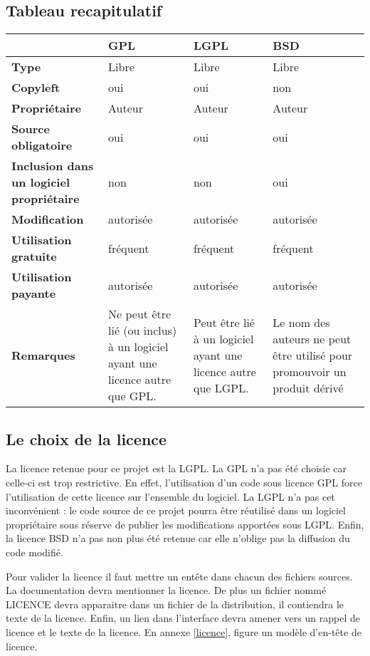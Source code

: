 	\subsection{Tableau recapitulatif}
		\begin{tabular}{|p{3cm}|p{3cm}|p{3cm}|p{3cm}|}
			\hline                 
			& \textbf{GPL} & \textbf{LGPL} & \textbf{BSD} \\              
			\hline                 
			\textbf{Type} & Libre & Libre & Libre \\
			\hline                 
			\textbf{Copyleft} & oui & oui & non \\
			\hline                 
			\textbf{Propriétaire} & Auteur & Auteur & Auteur \\
			\hline                 
			\textbf{Source obligatoire} & oui & oui & oui \\
			\hline                 
			\textbf{Inclusion dans un logiciel propriétaire} & non & non & oui \\
			\hline                 
			\textbf{Modification} & autorisée & autorisée & autorisée \\
			\hline                 
			\textbf{Utilisation gratuite} & fréquent & fréquent & fréquent \\
			\hline                 
			\textbf{Utilisation payante} & autorisée & autorisée & autorisée \\
			\hline                 
			\textbf{Remarques} & Ne peut être lié (ou inclus) à un logiciel ayant une licence autre que GPL. & Peut être lié à un logiciel ayant une licence autre que LGPL. & Le nom des auteurs ne peut être utilisé pour promouvoir un produit dérivé \\
			\hline  
		\end{tabular}


	\subsection{Le choix de la licence}
		La licence retenue pour ce projet est la LGPL. La GPL n'a pas été choisie car celle-ci est trop restrictive. En effet, l'utilisation d'un code sous licence GPL force l'utilisation de cette licence sur l'ensemble du logiciel. La LGPL n'a pas cet inconvénient : le code source de ce projet pourra être réutilisé dans un logiciel propriétaire sous réserve de publier les modifications apportées sous LGPL. Enfin, la licence BSD n'a pas non plus été retenue car elle n'oblige pas la diffusion du code modifié.

		Pour valider la licence il faut mettre un entête dans chacun des fichiers sources. La documentation devra mentionner la licence. De plus un fichier nommé LICENCE devra apparaitre dans un fichier de la distribution, il contiendra le texte de la licence. Enfin, un lien dans l'interface devra amener vers un rappel de licence et le texte de la licence. En annexe \ref{licence}, figure un modèle d'en-tête de licence.